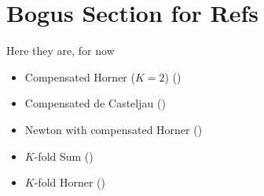 \documentclass[letterpaper,10pt]{article}
\begin{document}
\section{Bogus Section for Refs}

Here they are, for now
\begin{itemize}
  \item Compensated Horner (\(K = 2\)) (\cite{langlois_et_al:DSP:2006:442})
  \item Compensated de Casteljau (\cite{Jiang2010})
  \item Newton with compensated Horner (\cite{Graillat2008})
  \item \(K\)-fold Sum (\cite{Ogita2005})
  \item \(K\)-fold Horner (\cite{Graillat2009})
\end{itemize}



\end{document}
